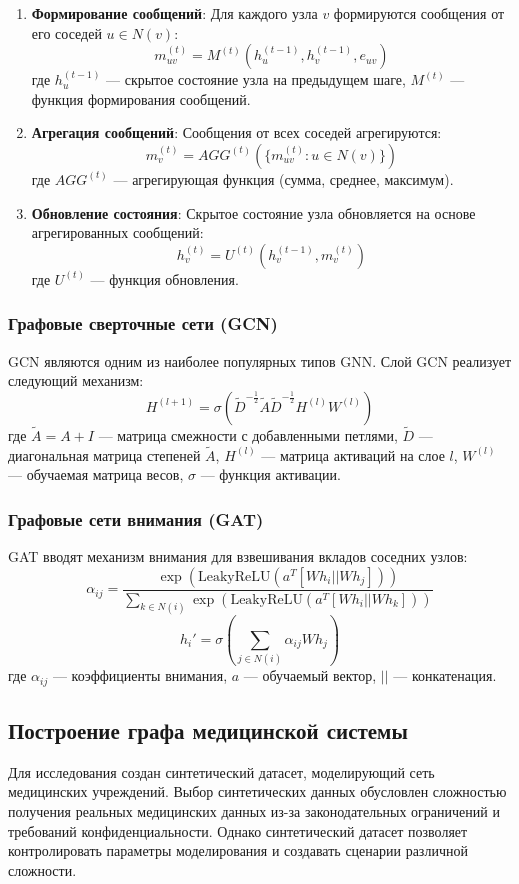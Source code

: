 \documentclass[12pt,a4paper]{article}
\begin{document}
	\begin{enumerate}
		\item \textbf{Формирование сообщений}: Для каждого узла $v$ формируются сообщения от его соседей $u \in N(v)$:
		$$ m_{uv}^{(t)} = M^{(t)}(h_u^{(t-1)}, h_v^{(t-1)}, e_{uv}) $$
		где $h_u^{(t-1)}$ — скрытое состояние узла на предыдущем шаге, $M^{(t)}$ — функция формирования сообщений.
		
		\item \textbf{Агрегация сообщений}: Сообщения от всех соседей агрегируются:
		$$ m_v^{(t)} = AGG^{(t)}(\{m_{uv}^{(t)} : u \in N(v)\}) $$
		где $AGG^{(t)}$ — агрегирующая функция (сумма, среднее, максимум).
		
		\item \textbf{Обновление состояния}: Скрытое состояние узла обновляется на основе агрегированных сообщений:
		$$ h_v^{(t)} = U^{(t)}(h_v^{(t-1)}, m_v^{(t)}) $$
		где $U^{(t)}$ — функция обновления.
	\end{enumerate}
	
	\subsubsection{Графовые сверточные сети (GCN)}
	GCN являются одним из наиболее популярных типов GNN. Слой GCN реализует следующий механизм:
	$$ H^{(l+1)} = \sigma(\tilde{D}^{-\frac{1}{2}}\tilde{A}\tilde{D}^{-\frac{1}{2}}H^{(l)}W^{(l)}) $$
	где $\tilde{A} = A + I$ — матрица смежности с добавленными петлями, $\tilde{D}$ — диагональная матрица степеней $\tilde{A}$, $H^{(l)}$ — матрица активаций на слое $l$, $W^{(l)}$ — обучаемая матрица весов, $\sigma$ — функция активации.
	
	\subsubsection{Графовые сети внимания (GAT)}
	GAT вводят механизм внимания для взвешивания вкладов соседних узлов:
	$$ \alpha_{ij} = \frac{\exp(\text{LeakyReLU}(a^T[Wh_i || Wh_j]))}{\sum_{k \in N(i)}\exp(\text{LeakyReLU}(a^T[Wh_i || Wh_k]))} $$
	$$ h_i' = \sigma\left(\sum_{j \in N(i)}\alpha_{ij}Wh_j\right) $$
	где $\alpha_{ij}$ — коэффициенты внимания, $a$ — обучаемый вектор, $||$ — конкатенация.
	
	\subsection{Построение графа медицинской системы}
	Для исследования создан синтетический датасет, моделирующий сеть медицинских учреждений. Выбор синтетических данных обусловлен сложностью получения реальных медицинских данных из-за законодательных ограничений и требований конфиденциальности. Однако синтетический датасет позволяет контролировать параметры моделирования и создавать сценарии различной сложности.
	
\end{document}
